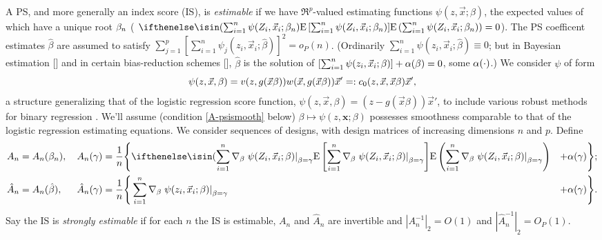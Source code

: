 \documentclass{article}
\theoremstyle{remark}
\begin{document}
A PS, and more generally an index score (IS), is \textit{estimable} if we have $\Re^{p}$-valued estimating functions $\psi (z, \vec{x}; \beta)$, the expected values of which have a unique root  $\beta_{n }$ (  $\E{ \sum_{i=1}^{n}\psi(Z_{i}, \vec{x}_{i}; \betatrue) } =0 $). 
The PS coefficent estimates  $\hat{\beta}$ are assumed to satisfy $\sum_{j=1}^{p}\left[\sum_{i=1}^{n}\psi_{j}(z_{i}, \vec{x}_{i}; \hat{\beta})\right]^{2} = o_{P}(n)$. (Ordinarily $\sum_{i=1}^{n}\psi(z_{i}, \vec{x}_{i}; \hat{\beta}) \equiv 0$; but in Bayesian estimation [\citealp[e.g.,][]{gelman2008weakly}] and in certain bias-reduction schemes [\citealp{firth:1993,kosmidisFirth2009bias}], $\hat\beta$ is the solution of $[\sum_{i=1}^{n}\psi(z_{i}, \vec{x}_{i}; \beta)] + \alpha(\beta) =0$, some $\alpha(\cdot)$.)
We consider $\psi$ of form 
\begin{equation}\label{eq:20}
  \psi(z, \vec{x}, \beta) = v(z, g(\vec{x}\beta)) w(\vec{x}, g(\vec{x}\beta)) \vec{x}' =: c_{0}(z, \vec{x}, \vec{x}\beta)\vec{x}',
\end{equation}
a structure generalizing that of the logistic regression score
function, $\psi(z, \vec{x}, \beta) = (z - g(\vec{x}\beta))\vec{x}'$,
to include various robust methods for binary regression \citep{cantoniRonchetti2001robustglms,liu2004robit}.  
We'll assume (condition \ref{A-psismooth} below) $\beta \mapsto \psi(z, \mathbf{x}; \beta)$ possesses smoothness comparable to that of the logistic regression estimating equations. We consider sequences of designs, with design matrices of increasing dimensions $n $ and $p$.  Define
\begin{align}
  \label{eq:7}
A_{n}  &=  A_{n}(\betatrue),\, & A_{n}(\gamma ) &= \frac{1}{n}\Bigg\{ \E{ \sum_{i=1}^{n}
                  \nabla_{\beta} \left. \psi(Z_{i}, \vec{x}_{i};
                  \beta) \right|_{\beta =  \gamma}} &+
                  \pen{\gamma}\Bigg\};  \\
\hat{A}_{n}  &=  A_{n}(\hat\beta),\, &\hat{A}_{n}(\gamma ) &= \frac{1}{n}\Bigg\{ \sum_{i=1}^{n}
                        \nabla_{\beta} \left. \psi(z_{i}, \vec{x}_{i};
                        \beta) \right|_{\beta =  \gamma} &+
                        \pen{\gamma}\Bigg\} .  \nonumber
\end{align}
Say the IS is \textit{strongly estimable} if for each $n$ the IS is estimable, $A_{n}$ and $\hat{A}_{n}$  
are invertible and $|{A}_{n}^{-1}|_{2}=O(1)$ and $|\hat{A}_{n}^{-1}|_{2}= O_{P}(1)$. 
\end{document}
